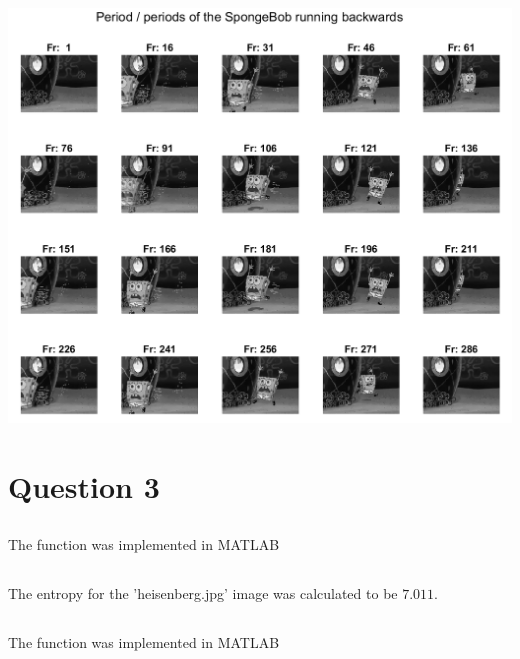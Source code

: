 \documentclass[a4paper]{iacas}
\begin{document}
\vskip 0.1in
\begin{minipage}{1\textwidth}
\centering
	\includegraphics[scale=0.9]{../imgs/imgs_q2/sponge_period_backwards.png}
\end{minipage}
\vskip 0.1in

















\newpage
\section{Question 3}

\subsection{}
The function was implemented in MATLAB

\subsection{}
The entropy for the 'heisenberg.jpg' image was calculated to be $7.011$. 

\subsection{}
The function was implemented in MATLAB
\end{document}
